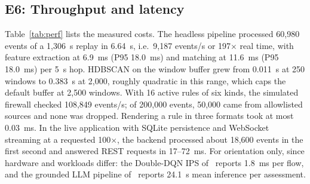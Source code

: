 \documentclass[conference]{IEEEtran}
\begin{document}
\subsection{E6: Throughput and latency}
Table~\ref{tab:perf} lists the measured costs. The headless pipeline processed 60,980 events of a 1,306~s replay in 6.64~s, i.e.\ 9,187 events/s or 197$\times$ real time, with feature extraction at 6.9~ms (P95 18.0~ms) and matching at 11.6~ms (P95 18.0~ms) per 5~s hop. HDBSCAN on the window buffer grew from 0.011~s at 250 windows to 0.383~s at 2,000, roughly quadratic in this range, which caps the default buffer at 2,500 windows. With 16 active rules of six kinds, the simulated firewall checked 108,849 events/s; of 200,000 events, 50,000 came from allowlisted sources and none was dropped. Rendering a rule in three formats took at most 0.03~ms. In the live application with SQLite persistence and WebSocket streaming at a requested 100$\times$, the backend processed about 18,600 events in the first second and answered REST requests in 17--72~ms. For orientation only, since hardware and workloads differ: the Double-DQN IPS of~\cite{mallik2026} reports 1.8~ms per flow, and the grounded LLM pipeline of~\cite{oliveira2026} reports 24.1~s mean inference per assessment.

\begin{table}[t]
\centering
\caption{E6: Measured throughput and latency}
\label{tab:perf}
\footnotesize
{}
\end{table}
\end{document}
